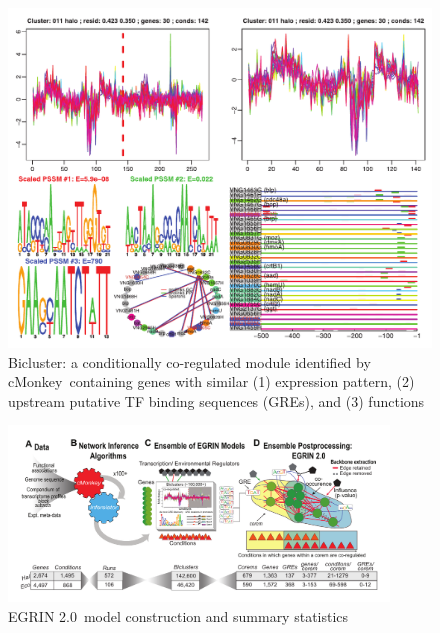 \documentclass{article}
\newcommand{\tmsamp}[1]{\textsf{#1}}
\newcommand{\cm}{\tmsamp{cMonkey}}
\newcommand{\egrine}{{\tmsamp{EGRIN 2.0}}}
\begin{document}
\begin{figure}[h!]
\centering
\includegraphics[width=0.9\linewidth]{figures/bicluster}
\caption[Bicluster: a conditionally co-regulated module identified by \cm\ containing genes with similar (1)  expression pattern, (2) upstream putative TF binding sequences (GREs), and (3) functions]{Bicluster: a conditionally co-regulated module identified by \cm\ containing genes with similar (1)  expression pattern, (2) upstream putative TF binding sequences (GREs), and (3) functions}
\label{fig:bicluster}
\end{figure}

\begin{figure}[h!]
    \centering
    \includegraphics[width=0.9\textwidth]{figures/egrin2_fig1}
 	\caption[\egrine~model construction and summary statistics]{\egrine~model construction and summary statistics}
    \label{fig:egrin2:1}
\end{figure}
\end{document}
